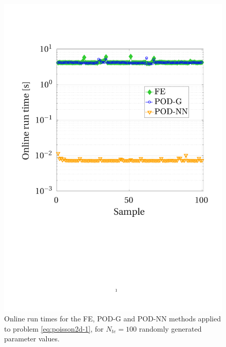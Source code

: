 \documentclass[12pt, a4paper, twoside, openright, notitlepage]{report}
\numberwithin{equation}{chapter}
\theoremstyle{theorem}
\theoremstyle{definition}
\theoremstyle{remark}
\theoremstyle{proposition}
\numberwithin{figure}{chapter}
\begin{document}
		\begin{figure}[H]
			\center
			\includegraphics[scale = 0.39, trim = {1.5cm 9cm 1.25cm 3.5cm}, clip]{poisson2d_1_time}
			
			\caption{Online run times for the FE, POD-G and POD-NN methods applied to problem \eqref{eq:poisson2d-1}, for $N_{te} = 100$ randomly generated parameter values. }
			\label{fig:poisson2d-1-fig1}
		\end{figure}
		
		\vspace*{-0.2cm}
		
\end{document}
